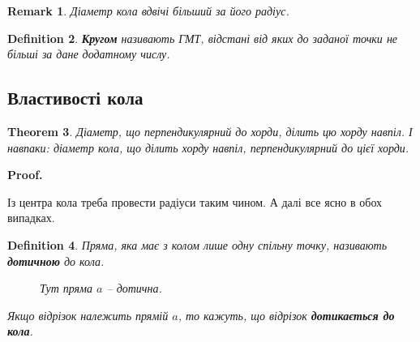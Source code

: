 \documentclass[a4paper, 10pt]{article}
\makeatletter
\def\qed{$\blacksquare$}
\theoremstyle{theoremdd}
\newtheorem{theorem}{Theorem}[subsection]
\theoremstyle{theoremdd}
\theoremstyle{theoremdd}
\newtheorem{definition}[theorem]{Definition}
\theoremstyle{theoremdd}
\theoremstyle{theoremdd}
\theoremstyle{theoremdd}
\theoremstyle{theoremdd}
\newtheorem{remark}[theorem]{Remark}
\theoremstyle{theoremdd}
\theoremstyle{theoremdd}
\renewenvironment{proof}[1][Proof.\\]{\par
\pushQED{\hfill \qed}%
\normalfont \topsep6\p@\@plus6\p@\relax
\trivlist
\item\relax
{\bfseries
#1\@addpunct{.}}\hspace\labelsep\ignorespaces
}{%
\popQED\endtrivlist\@endpefalse
}
\makeatother
\begin{document}
\begin{remark}
Діаметр кола вдвічі більший за його радіус.
\end{remark}

\begin{definition}
\textbf{Кругом} називають ГМТ, відстані від яких до заданої точки не більші за дане додатному числу.
\end{definition}

\subsection{Властивості кола}
\begin{theorem}
Діаметр, що перпендикулярний до хорди, ділить цю хорду навпіл. І навпаки: діаметр кола, що ділить хорду навпіл, перпендикулярний до цієї хорди.
\end{theorem}

\begin{proof}
Із центра кола треба провести радіуси таким чином. А далі все ясно в обох випадках.
\begin{figure}[H]
\centering
{}
\end{figure}
\end{proof}

\begin{definition}
Пряма, яка має з колом лише одну спільну точку, називають \textbf{дотичною} до кола.
\begin{figure}[H]
\centering
{}
\caption*{Тут пряма $a$ -- дотична.}
\end{figure}
Якщо відрізок належить прямій $a$, то кажуть, що відрізок \textbf{дотикається до кола}.
\end{definition}
\end{document}
